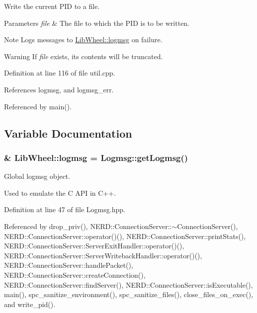 \-Write the current \-P\-I\-D to a file. 


\begin{DoxyParams}{\-Parameters}
{\em file} & \-The file to which the \-P\-I\-D is to be written. \\
\hline
\end{DoxyParams}
\begin{DoxyNote}{\-Note}
\-Logs messages to \hyperlink{namespaceLibWheel_af4ca70f4f65b2948701218436516a679}{\-Lib\-Wheel\-::logmsg} on failure. 
\end{DoxyNote}
\begin{DoxyWarning}{\-Warning}
\-If {\itshape file\/} exists, its contents will be truncated. 
\end{DoxyWarning}


\-Definition at line 116 of file util.\-cpp.



\-References logmsg, and logmsg\-\_\-err.



\-Referenced by main().



\subsection{\-Variable \-Documentation}
\hypertarget{namespaceLibWheel_af4ca70f4f65b2948701218436516a679}{
\subsubsection[{logmsg}]{\& {\bf \-Lib\-Wheel\-::logmsg} = \-Logmsg\-::get\-Logmsg()}}
\label{namespaceLibWheel_af4ca70f4f65b2948701218436516a679}


\-Global logmsg object. 

\-Used to emulate the \-C \-A\-P\-I in \-C++. 

\-Definition at line 47 of file \-Logmsg.\-hpp.



\-Referenced by drop\-\_\-priv(), \-N\-E\-R\-D\-::\-Connection\-Server\-::$\sim$\-Connection\-Server(), \-N\-E\-R\-D\-::\-Connection\-Server\-::operator()(), \-N\-E\-R\-D\-::\-Connection\-Server\-::print\-Stats(), \-N\-E\-R\-D\-::\-Connection\-Server\-::\-Server\-Exit\-Handler\-::operator()(), \-N\-E\-R\-D\-::\-Connection\-Server\-::\-Server\-Writeback\-Handler\-::operator()(), \-N\-E\-R\-D\-::\-Connection\-Server\-::handle\-Packet(), \-N\-E\-R\-D\-::\-Connection\-Server\-::create\-Connection(), \-N\-E\-R\-D\-::\-Connection\-Server\-::find\-Server(), \-N\-E\-R\-D\-::\-Connection\-Server\-::is\-Executable(), main(), spc\-\_\-sanitize\-\_\-environment(), spc\-\_\-sanitize\-\_\-files(), close\-\_\-files\-\_\-on\-\_\-exec(), and write\-\_\-pid().

